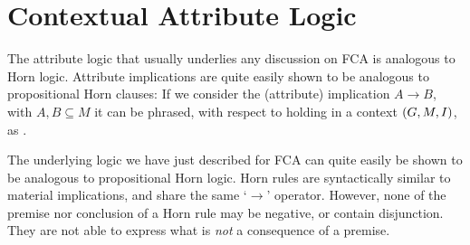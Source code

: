 \section{Contextual Attribute Logic}
\label{section:contextual-attribute-logic}

The attribute logic that usually underlies any discussion on FCA is analogous to Horn logic. Attribute implications are quite easily shown to be analogous to propositional Horn clauses: If we consider
the (attribute) implication $A \rightarrow B$, with $A, B \subseteq M$ it can be phrased, with respect to holding in a context $(G,M,\mathrel{I})$, as .

The underlying logic we have just described for FCA can quite easily be shown to be analogous to propositional Horn logic. Horn rules are syntactically similar to material implications, and share the
same `$\rightarrow$' operator. However, none of the premise nor conclusion of a Horn rule may be negative, or contain disjunction. They are not able to express what is \textit{not} a consequence of a premise.




